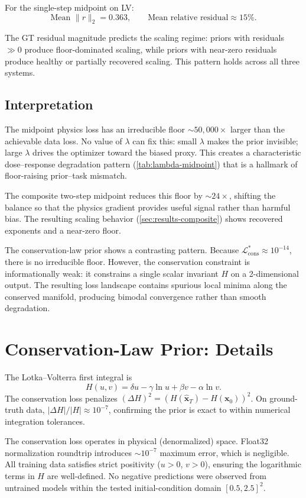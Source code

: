 \documentclass[11pt]{article}
\begin{document}
For the single-step midpoint on LV:
\[
\text{Mean } \|r\|_2 = 0.363, \qquad
\text{Mean relative residual} \approx 15\%.
\]

The GT residual magnitude predicts the scaling regime: priors with residuals $\gg 0$ produce floor-dominated scaling, while priors with near-zero residuals produce healthy or partially recovered scaling.
This pattern holds across all three systems.

\subsection{Interpretation}

The midpoint physics loss has an irreducible floor $\sim\!50{,}000\times$ larger than the achievable data loss.
No value of $\lambda$ can fix this: small $\lambda$ makes the prior invisible; large $\lambda$ drives the optimizer toward the biased proxy.
This creates a characteristic dose--response degradation pattern (\cref{tab:lambda-midpoint}) that is a hallmark of floor-raising prior--task mismatch.

The composite two-step midpoint reduces this floor by $\sim\!24\times$, shifting the balance so that the physics gradient provides useful signal rather than harmful bias.
The resulting scaling behavior (\cref{sec:results-composite}) shows recovered exponents and a near-zero floor.

The conservation-law prior shows a contrasting pattern.
Because $\mathcal{L}_{\mathrm{cons}}^* \approx 10^{-14}$, there is no irreducible floor.
However, the conservation constraint is informationally weak: it constrains a single scalar invariant $H$ on a 2-dimensional output.
The resulting loss landscape contains spurious local minima along the conserved manifold, producing bimodal convergence rather than smooth degradation.

\section{Conservation-Law Prior: Details}
\label{app:conservation-details}

The Lotka--Volterra first integral is
\[
H(u,v) = \delta u - \gamma \ln u + \beta v - \alpha \ln v.
\]
The conservation loss penalizes $(\Delta H)^2 = (H(\hat{\bm{x}}_T) - H(\bm{x}_0))^2$.
On ground-truth data, $|\Delta H| / |H| \approx 10^{-7}$, confirming the prior is exact to within numerical integration tolerances.

The conservation loss operates in physical (denormalized) space.
Float32 normalization roundtrip introduces $\sim 10^{-7}$ maximum error, which is negligible.
All training data satisfies strict positivity ($u > 0$, $v > 0$), ensuring the logarithmic terms in $H$ are well-defined.
No negative predictions were observed from untrained models within the tested initial-condition domain $[0.5, 2.5]^2$.
\end{document}
